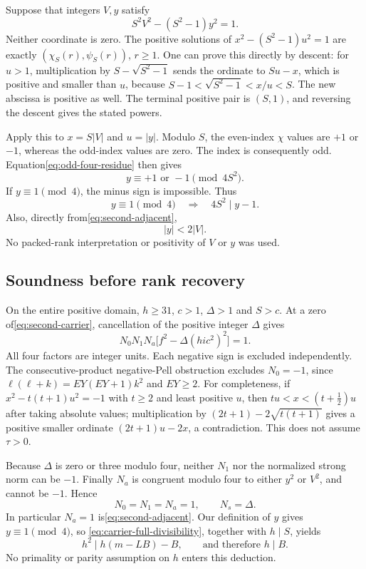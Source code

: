 Suppose that integers $V,y$ satisfy
\begin{equation}
 S^2V^2-(S^2-1)y^2=1.\label{eq:second-adjacent}
\end{equation}
Neither coordinate is zero.  The positive solutions of
$x^2-(S^2-1)u^2=1$ are exactly
$(\chi_S(r),\psi_S(r))$, $r\ge1$.  One can prove this directly by
descent: for $u>1$, multiplication by $S-\sqrt{S^2-1}$ sends the
ordinate to $Su-x$, which is positive and smaller than $u$, because
$S-1<\sqrt{S^2-1}<x/u<S$.  The new abscissa is positive as well.
The terminal positive pair is $(S,1)$, and reversing the descent gives
the stated powers.

Apply this to $x=S|V|$ and $u=|y|$.  Modulo $S$, the even-index
$\chi$ values are $+1$ or $-1$, whereas the odd-index values are zero.
The index is consequently odd.  Equation\eqref{eq:odd-four-residue}
then gives
\[
 y\equiv+1\text{ or }-1\pmod{4S^2}.
\]
If $y\equiv1\pmod4$, the minus sign is impossible.  Thus
\begin{equation}
 y\equiv1\pmod4\quad\Longrightarrow\quad4S^2\mid y-1.
 \label{eq:carrier-full-divisibility}
\end{equation}
Also, directly from\eqref{eq:second-adjacent},
\begin{equation}
 |y|<2|V|.\label{eq:carrier-root-bound}
\end{equation}
No packed-rank interpretation or positivity of $V$ or $y$ was used.

\subsection{Soundness before rank recovery}

On the entire positive domain, $h\ge31$, $c>1$, $\Delta>1$ and
$S>c$.  At a zero of\eqref{eq:second-carrier}, cancellation of
the positive integer $\Delta$ gives
\[
 N_0N_1N_a\bigl[f^2-\Delta(hi c^2)^2\bigr]=1.
\]
All four factors are integer units.  Each negative sign is excluded
independently.  The consecutive-product negative-Pell obstruction excludes
$N_0=-1$, since
$\ell(\ell+k)=EY(EY+1)k^2$ and $EY\ge2$.  For completeness, if
$x^2-t(t+1)u^2=-1$ with $t\ge2$ and least positive $u$, then
$tu<x<(t+\tfrac12)u$ after taking absolute values; multiplication by
$(2t+1)-2\sqrt{t(t+1)}$ gives a positive smaller ordinate
$(2t+1)u-2x$, a contradiction.  This does not assume $\tau>0$.

Because $\Delta$ is zero or three modulo four, neither $N_1$ nor the
normalized strong norm can be $-1$.  Finally $N_a$ is congruent modulo
four to either $y^2$ or $V^2$, and cannot be $-1$.  Hence
\begin{equation}
 N_0=N_1=N_a=1,\qquad N_s=\Delta.
 \label{eq:four-unit-signs}
\end{equation}
In particular $N_a=1$ is\eqref{eq:second-adjacent}.  Our definition
of $y$ gives $y\equiv1\pmod4$, so
\eqref{eq:carrier-full-divisibility}, together with $h\mid S$, yields
\[
 h^2\mid h(m-LB)-B,\qquad\text{and therefore }h\mid B.
\]
No primality or parity assumption on $h$ enters this deduction.

